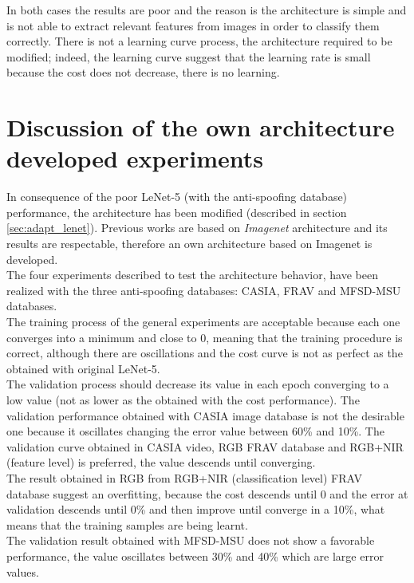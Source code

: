 In both cases the results are poor and the reason is the architecture is simple and is not able to extract relevant features from images in order to classify them correctly. There is not a learning curve process, the architecture required to be modified; indeed, the learning curve suggest that the learning rate is small because the cost does not decrease, there is no learning.

\section{Discussion of the own architecture developed experiments}
In consequence of the poor LeNet-5 (with the anti-spoofing database) performance, the architecture has been modified (described in section \ref{sec:adapt_lenet}). Previous works are based on \textit{Imagenet} architecture and its results are respectable, therefore an own architecture based on Imagenet is developed.\\

The four experiments described to test the architecture behavior, have been realized with the three anti-spoofing databases: CASIA, FRAV and MFSD-MSU databases.\\

The training process of the general experiments are acceptable because each one converges into a minimum and close to 0, meaning that the training procedure is correct, although there are oscillations and the cost curve is not as perfect as the obtained with original LeNet-5.\\

The validation process should decrease its value in each epoch converging to a low value (not as lower as the obtained with the cost performance). The validation performance obtained with CASIA image database is not the desirable one because it oscillates changing the error value between 60\% and 10\%. The validation curve obtained in CASIA video, RGB FRAV database and RGB+NIR (feature level) is preferred, the value descends until converging.\\

The result obtained in RGB from RGB+NIR (classification level) FRAV database suggest an overfitting, because the cost descends until 0 and the error at validation descends until 0\% and then improve until converge in a 10\%, what means that the training samples are being learnt.\\

The validation result obtained with MFSD-MSU does not show a favorable performance, the value oscillates between 30\% and 40\% which are large error values.\\

